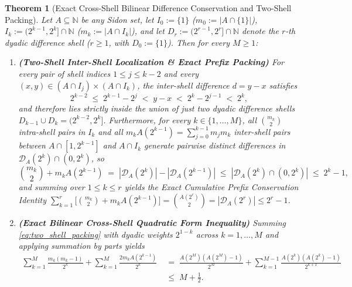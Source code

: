 \documentclass[11pt,reqno]{amsart}
\newtheorem{theorem}{Theorem}[section]
\theoremstyle{definition}
\theoremstyle{remark}
\begin{document}
\begin{theorem}[Exact Cross-Shell Bilinear Difference Conservation and Two-Shell Packing]\label{thm:cross_shell}
Let $A \subseteq \mathbb{N}$ be any Sidon set, let $I_0 := \{1\}$ ($m_0 := |A \cap \{1\}|$), $I_k := (2^{k-1}, 2^k] \cap \mathbb{N}$ ($m_k := |A \cap I_k|$), and let $D_r := (2^{r-1}, 2^r] \cap \mathbb{N}$ denote the $r$-th dyadic difference shell ($r \ge 1$, with $D_0 := \{1\}$). Then for every $M \ge 1$:
\begin{enumerate}
  \item[\textup{(a)}] \textbf{(Two-Shell Inter-Shell Localization \& Exact Prefix Packing)} For every pair of shell indices $1 \le j \le k - 2$ and every $(x, y) \in (A \cap I_j) \times (A \cap I_k)$, the inter-shell difference $d = y - x$ satisfies
  \begin{equation}\label{eq:two_shell_localization}
    2^{k-2} \;\le\; 2^{k-1} - 2^j \;<\; y - x \;<\; 2^k - 2^{j-1} \;<\; 2^k,
  \end{equation}
  and therefore lies strictly inside the union of just \emph{two} dyadic difference shells $D_{k-1} \cup D_k = (2^{k-2}, 2^k]$. Furthermore, for every $k \in \{1, \dots, M\}$, all $\binom{m_k}{2}$ intra-shell pairs in $I_k$ and all $m_k A(2^{k-1}) = \sum_{j=0}^{k-1} m_j m_k$ inter-shell pairs between $A \cap [1, 2^{k-1}]$ and $A \cap I_k$ generate pairwise distinct differences in $\mathcal{D}_A(2^k) \cap (0, 2^k)$, so
  \begin{equation}\label{eq:two_shell_packing}
    \binom{m_k}{2} + m_k A(2^{k-1}) \;=\; |\mathcal{D}_A(2^k)| - |\mathcal{D}_A(2^{k-1})| \;\le\; \left|\mathcal{D}_A(2^k) \cap (0, 2^k)\right| \;\le\; 2^k - 1,
  \end{equation}
  and summing over $1 \le k \le r$ yields the Exact Cumulative Prefix Conservation Identity $\sum_{k=1}^r \bigl[\binom{m_k}{2} + m_k A(2^{k-1})\bigr] = \binom{A(2^r)}{2} = |\mathcal{D}_A(2^r)| \le 2^r - 1$.
  \item[\textup{(b)}] \textbf{(Exact Bilinear Cross-Shell Quadratic Form Inequality)} Summing \eqref{eq:two_shell_packing} with dyadic weights $2^{1-k}$ across $k = 1, \dots, M$ and applying summation by parts yields
  \begin{equation}\label{eq:bilinear_dyadic}
    \begin{aligned}
      \sum_{k=1}^M \frac{m_k(m_k - 1)}{2^k} + \sum_{k=1}^M \frac{2 m_k A(2^{k-1})}{2^k} &\;=\; \frac{A(2^M)(A(2^M)-1)}{2^M} + \sum_{k=1}^{M-1} \frac{A(2^k)(A(2^k)-1)}{2^{k+1}} \\
      &\;\le\; M + \frac{1}{2}.

\end{aligned}
\end{equation}
\end{enumerate}
\end{theorem}
\end{document}

